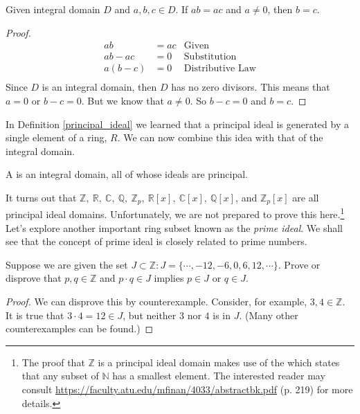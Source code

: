 \begin{prop}\label{proposition:rings:cancellation_law}
Given integral domain $D$ and $a,b,c\in D$.  If $ab=ac$ and $a\neq 0$, then $b=c$.

\begin{proof}
\begin{align*}
    ab&=ac & \text{Given}\\
    ab-ac&=0 & \text{Substitution}\\
    a(b-c)&=0 & \text{Distributive Law}\\
\end{align*}
Since $D$ is an integral domain, then $D$ has no zero divisors.  This means that $a=0$ or $b-c=0$.  But we know that $a\neq 0$.  So $b-c=0$ and $b=c$.
\end{proof}
\end{prop}


In Definition \ref{principal_ideal} we learned that a principal ideal is generated by a single element of a ring, $R$.  We can now combine this idea with that of the integral domain.

\begin{defn}\label{princ_ideal_dom}
A  is an integral domain, all of whose ideals are principal.
\end{defn}

It turns out that ${\mathbb Z},~{\mathbb R},~{\mathbb C},~{\mathbb Q},~{\mathbb Z}_p,~{\mathbb R}[x],~{\mathbb C}[x],~{\mathbb Q}[x]$, and ${\mathbb Z}_p[x]$ are all principal ideal domains.  Unfortunately, we are not prepared to prove this here.\footnote{The proof that ${\mathbb Z}$ is a principal ideal domain makes use of the  which states that any subset of ${\mathbb N}$ has a smallest element.  The interested reader may consult \url{https://faculty.atu.edu/mfinan/4033/abstractbk.pdf} (p. 219) for more details.}\\

Let's explore another important ring subset known as the \emph{prime ideal}.  We shall see that the concept of prime ideal is closely related to prime numbers.


\begin{example}\label{example:rings:not_prime_ideal}
Suppose we are given the set $J\subset{\mathbb Z}:J=\{\cdots,-12,-6,0,6,12,\cdots\}$.  Prove or disprove that $p,q\in{\mathbb Z}$ and $p\cdot q\in J$ implies $p\in J$ or $q\in J$. 
\end{example}

\begin{proof}
We can disprove this by counterexample.  Consider, for example, $3,4\in{\mathbb Z}$.  It is true that $3\cdot 4=12\in J$, but neither $3$ nor $4$ is in $J$.  (Many other counterexamples can be found.)
\end{proof}


